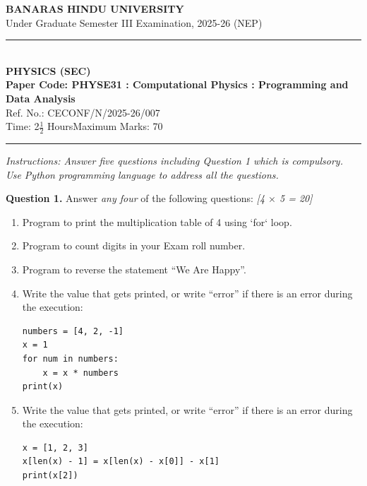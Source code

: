 \documentclass[11pt,a4paper]{article}
\newcommand{\pts}[1]{\hfill \textit{[#1]}}
\begin{document}
\begin{center}
  {\large\bfseries BANARAS HINDU UNIVERSITY}\\[2pt]
  {\normalsize Under Graduate Semester III Examination, 2025-26 (NEP)}\\[6pt]
  \rule{0.8\linewidth}{0.5pt}\\[6pt]
  {\large\bfseries PHYSICS (SEC)}\\[4pt]
  {\large\bfseries Paper Code: PHYSE31 : Computational Physics : Programming and Data Analysis}\\[2pt]
  {\small Ref. No.: CECONF/N/2025-26/007}\\[4pt]
  {\normalsize Time: 2$\frac{1}{2}$ Hours\hfill Maximum Marks: 70}
\end{center}

\rule{\linewidth}{0.4pt}

\smallskip

\noindent \textit{Instructions: Answer five questions including Question 1 which is compulsory. Use Python programming language to address all the questions.}

\bigskip

\noindent \textbf{Question 1.} Answer \textit{any four} of the following questions: \pts{4 $\times$ 5 = 20}
\begin{enumerate}[label=(\alph*)]
  \item Program to print the multiplication table of 4 using `for` loop.
  \item Program to count digits in your Exam roll number.
  \item Program to reverse the statement ``We Are Happy''.
  \item Write the value that gets printed, or write ``error'' if there is an error during the execution:
\begin{lstlisting}
numbers = [4, 2, -1]
x = 1
for num in numbers:
    x = x * numbers
print(x)
\end{lstlisting}
  \item Write the value that gets printed, or write ``error'' if there is an error during the execution:
\begin{lstlisting}
x = [1, 2, 3]
x[len(x) - 1] = x[len(x) - x[0]] - x[1]
print(x[2])
\end{lstlisting}
\end{enumerate}

\bigskip
\end{document}

